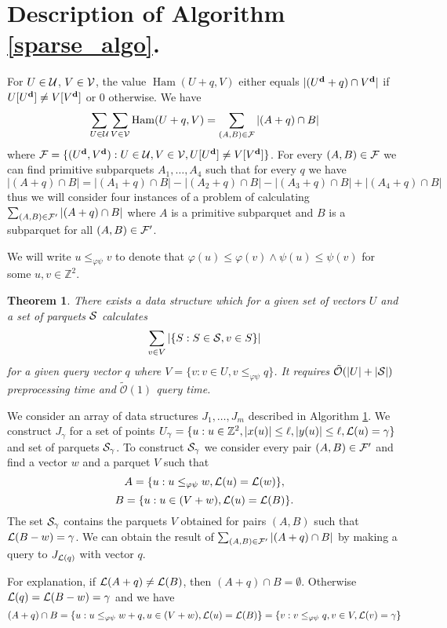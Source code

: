 \documentclass[11pt]{article}
\newcommand{\Z}{\mathbb{Z}}
\newcommand{\tO}{\tilde{\mathcal{O}}}
\renewcommand{\phi}{\varphi}
\newcommand{\set}[1]{\lbrace #1 \rbrace}
\DeclareMathOperator*{\Ham}{Ham}
\theoremstyle{plain}
\newtheorem{theorem}{Theorem}
\theoremstyle{definition}
\begin{document}
\section{Description of Algorithm \ref{sparse_algo}.}


For $U \in \U$, $V \in \V$, the value $ \Ham(U + q, V)$ either equals $|(\d{U} + q) \cap \d{V}|$ if $U[\d{U}] \neq V[\d{V}]$ or $0$ otherwise.
We have
$$ \sum_{U \in \U} \sum_{V \in \V} \Ham(U + q, V) = \sum_{(A, B) \in \F} |(A + q) \cap B| $$
where $ \F = \set{(\d{U}, \d{V}) : U \in \U, V \in \V, U[\d{U}] \neq V[\d{V}]} $. 
For every $(A, B) \in \F$ we can find primitive subparquets $A_1, \dots, A_4$ such that for every $q$ we have
$$ |(A + q) \cap B| = |(A_1 + q) \cap B| - |(A_2 + q) \cap B| - |(A_3 + q) \cap B| + |(A_4 + q) \cap B| $$
thus we will consider four instances of a problem of calculating $\sum_{(A, B) \in \F'} |(A + q) \cap B|$ where $A$ is a primitive subparquet and $B$ is a subparquet for all $(A, B) \in \F'$.

We will write $u \le_{\phi\psi} v$ to denote that $\phi(u) \le \phi(v) \wedge \psi(u) \le \psi(v)$ for some $u, v \in \Z^2$.


\begin{theorem}
	\label{sweeper}
	There exists a data structure which for a given set of vectors $U$ and a set of parquets $\S$ calculates
	$$ \sum_{v \in V} |\set{S : S \in \S, v \in S}| $$
	for a given query vector $q$ where $V = \set{v : v \in U, v \le_{\phi\psi} q}$.
	It requires $\tO(|U| + |\S|)$ preprocessing time and $\tO(1)$ query time.
\end{theorem}


We consider an array of data structures $J_1, \dots, J_m$ described in Algorithm \ref{sweeper}.
We construct $J_\gamma$ for a set of points $U_\gamma = \set{u : u \in \Z^2, |x(u)| \le \ell, |y(u)| \le \ell, \L(u) = \gamma}$ and set of parquets $\S_\gamma$.
To construct $\S_\gamma$ we consider every pair $(A, B) \in \F'$ and find a vector $w$ and a parquet $V$ such that 
$$ A = \set{u : u \le_{\phi\psi} w, \L(u) = \L(w)},$$
$$ B = \set{u : u \in (V + w), \L(u) = \L(B)}.$$
The set $\S_\gamma$ contains the parquets $V$ obtained for pairs $(A, B)$ such that $\L(B - w) = \gamma$.
We can obtain the result of $\sum_{(A, B) \in \F'} |(A + q) \cap B|$ by making a query to $J_{\L(q)}$ with vector $q$.

For explanation, if $\L(A + q) \neq \L(B)$, then $(A + q) \cap B = \emptyset$.
Otherwise $\L(q) = \L(B - w) = \gamma$ and we have
$$ (A + q) \cap B = \set{u : u \le_{\phi\psi} w + q, u \in (V + w), \L(u) = \L(B)} = \set{v : v \le_{\phi\psi} q, v \in V, \L(v) = \gamma} $$
\end{document}
